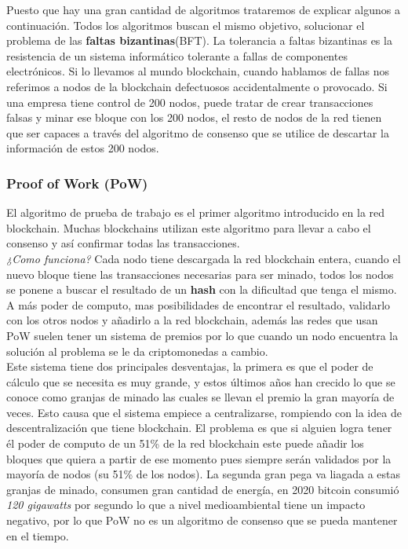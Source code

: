 Puesto que hay una gran cantidad de algoritmos trataremos de explicar algunos a continuación\cite{algoConsenso}. Todos los algoritmos buscan el mismo objetivo, solucionar el problema de las \textbf{faltas bizantinas}(BFT)\cite{BFT}. La tolerancia a faltas bizantinas es la resistencia de un sistema informático tolerante a fallas de componentes electrónicos. Si lo llevamos al mundo blockchain, cuando hablamos de fallas nos referimos a nodos de la blockchain defectuosos accidentalmente o provocado. Si una empresa tiene control de 200 nodos, puede tratar de crear transacciones falsas y minar ese bloque con los 200 nodos, el resto de nodos de la red tienen que ser capaces a través del algoritmo de consenso que se utilice de descartar la información de estos 200 nodos.

\subsubsection{Proof of Work (PoW)}

El algoritmo de prueba de trabajo es el primer algoritmo introducido en la red blockchain. Muchas blockchains utilizan este algoritmo para llevar a cabo el consenso y así confirmar todas las transacciones. \\ 

\emph{¿Como funciona?} Cada nodo tiene descargada la red blockchain entera, cuando el nuevo bloque tiene las transacciones necesarias para ser minado, todos los nodos se ponene a buscar el resultado de un \textbf{hash} con la dificultad que tenga el mismo. A más poder de computo, mas posibilidades de encontrar el resultado, validarlo con los otros nodos y añadirlo a la red blockchain, además las redes que usan PoW suelen tener un sistema de premios por lo que cuando un nodo encuentra la solución al problema se le da criptomonedas a cambio. \\

Este sistema tiene dos principales desventajas, la primera es que el poder de cálculo que se necesita es muy grande, y estos últimos años han crecido lo que se conoce como granjas de minado las cuales se llevan el premio la gran mayoría de veces. Esto causa que el sistema empiece a centralizarse, rompiendo con la idea de descentralización que tiene blockchain. El problema es que si alguien logra tener él poder de computo de un 51\% de la red blockchain este puede añadir los bloques que quiera a partir de ese momento pues siempre serán validados por la mayoría de nodos (su 51\% de los nodos). La segunda gran pega va liagada a estas granjas de minado, consumen gran cantidad de energía, en 2020 bitcoin consumió \emph{120 gigawatts} por segundo\cite{bitcoinEnergyUse} lo que a nivel medioambiental tiene un impacto negativo, por lo que PoW no es un algoritmo de consenso que se pueda mantener en el tiempo.


